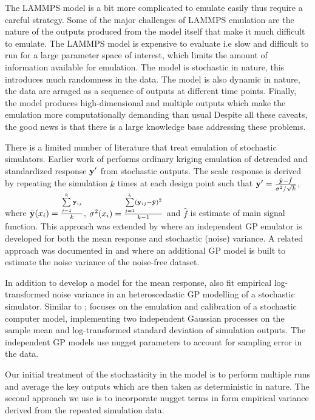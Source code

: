 The LAMMPS model is a bit more complicated to emulate easily thus require a careful strategy.
Some of the major challenges of LAMMPS emulation are the nature of the outputs produced from the model itself that make it much difficult to emulate. The LAMMPS model is expensive to evaluate i.e slow and difficult to run for a large parameter space of interest, which limits the amount of information available for emulation. The model is stochastic in nature, this introduces much randomness in the data. The model is also dynamic in nature, the data are arraged as a sequence of outputs at different time points. Finally, the model produces high-dimensional and multiple outputs which make the emulation more computationally demanding than usual
Despite all these caveats, the good news is that there is a large knowledge base addressing these problems.

There is a limited number of literature that treat emulation of stochastic simulators. Earlier work of \citet{pd23} performs ordinary kriging emulation of detrended and standardized response ${\bf y}'$ from stochastic outputs. 
The scale response is derived by repeating the simulation $k$ times at each design point such that
${\bf y}'=\frac{\bar {{\bf y}}-\hat  f}{\mathbf{\sigma}^2/\sqrt{k}}$, where $\bar {{\bf y}}(x_i)=\frac{\sum \limits_{j=1}^k{\bf y}_{ij}}{k}$, $\sigma^2(x_i)=\frac{\sum \limits_{j=1}^{k}({\bf y}_{ij}-\bar {{\bf y}})^2}{k-1}$ and $\hat  f$ is estimate of main signal function. This approach was extended by \citet{pd24} where an independent GP emulator is developed for both the mean response and stochastic (noise) variance.  A related approach was documented in \citet{pd22} and \citet{pd25} where an additional GP model is built to estimate the noise variance of the noise-free dataset.

In addition to develop a model for the mean response, \citet{pd21} also fit empirical log-transformed noise variance in an heteroscedastic GP modelling of a stochastic simulator. Similar to \citet{pd24} \citet{pd21}; \citet{pd26} focuses on the emulation and calibration of a stochastic computer model, implementing two independent Gaussian processes on the sample mean and log-transformed standard deviation of simulation outputs. The independent GP models use nugget parameters to account for sampling error in the data. 

Our initial treatment of the stochasticity in the model is to perform multiple runs and average the key outputs which are then taken as deterministic in nature. The second approach we use is to incorporate nugget terms in form empirical variance derived from the repeated simulation data.

